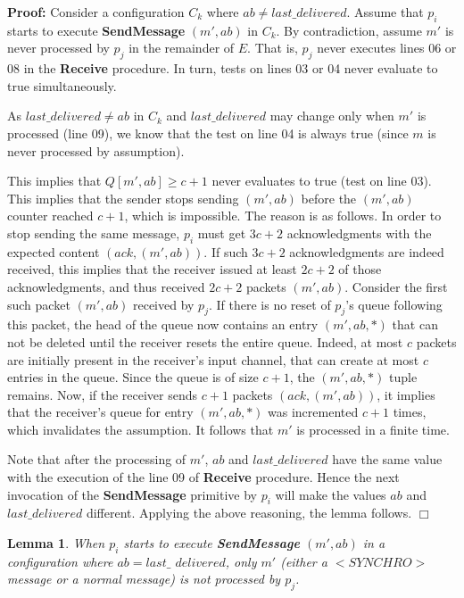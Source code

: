 \documentclass[11pt]{article}
\newtheorem{lemma}{Lemma}
\newenvironment{proof}{\noindent\textbf{Proof:}}{\hfill$\Box$}
\begin{document}
\begin{proof}
Consider a configuration $C_k$ where $ab \neq last\_delivered$. Assume that $p_i$ starts to execute \textbf{SendMessage} $(m',ab)$ in $C_k$. By contradiction, assume $m'$ is never processed by $p_j$ in the remainder of $E$. That is, $p_j$ never executes lines 06 or 08 in the \textbf{Receive} procedure. In turn, tests on lines 03 or 04 never evaluate to true simultaneously. 

As $last\_delivered \neq ab$ in $C_k$ and $last\_delivered$ may change only when $m'$ is processed (line 09), we know that the test on line 04 is always true (since $m$ is never processed by assumption).

This implies that $Q[m',ab] \geq c+1$ never evaluates to true (test on line 03). This implies that the sender stops sending $(m',ab)$ before the $(m',ab)$ counter reached $c+1$, which is impossible. The reason is as follows. In order to stop sending the same message, $p_i$ must get $3c+2$ acknowledgments with the expected content $(ack,(m',ab))$. If such $3c+2$ acknowledgments are indeed received, this implies that the receiver issued at least $2c+2$ of those acknowledgments, and thus received $2c+2$ packets $(m',ab)$. Consider the first such packet $(m',ab)$ received by $p_j$. If there is no reset of $p_j$'s queue following this packet, the head of the queue now contains an entry $(m',ab,*)$ that can not be deleted until the receiver resets the entire queue. Indeed, at most $c$ packets are initially present in the receiver's input channel, that can create at most $c$ entries in the queue. Since the queue is of size $c+1$, the $(m',ab,*)$ tuple remains. Now, if the receiver sends $c+1$ packets $(ack,(m',ab))$, it implies that the receiver's queue for entry $(m',ab,*)$ was incremented $c+1$ times, which invalidates the assumption. It follows that $m'$ is processed in a finite time.

Note that after the processing of $m'$, $ab$ and $last\_delivered$ have the same value with the execution of the line 09 of \textbf{Receive} procedure. Hence the next invocation of the \textbf{SendMessage} primitive by $p_i$ will make the values $ab$ and $last\_delivered$ different. Applying the above reasoning, the lemma follows.
\end{proof}

\begin{lemma}\label{lem:firstab=ld}
When $p_i$ starts to execute \textbf{SendMessage} $(m',ab)$ in a configuration where $ab = last\_$ $delivered$, only $m'$ (either a $<SYNCHRO>$ message or a normal message) is not processed by $p_j$.
\end{lemma}
\end{document}
